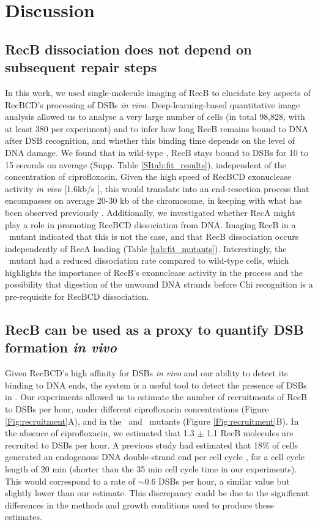 \section*{Discussion}

\subsection*{RecB dissociation does not depend on subsequent repair steps}
In this work, we used single-molecule imaging of RecB to elucidate key aspects of RecBCD's processing of DSBs \emph{in vivo}. Deep-learning-based quantitative image analysis allowed us to analyse a very large number of cells (in total 98,828, with at least 380 per experiment) and to infer how long RecB remains bound to DNA after DSB recognition, and whether this binding time depends on the level of DNA damage. We found that in wild-type \ecoli, RecB stays bound to DSBs for 10 to 15 seconds on average (Supp. Table \ref{SItab:fit_results}), independent of the concentration of ciprofloxacin. Given the high speed of RecBCD exonuclease activity \emph{in vivo} [1.6kb/s \cite{Wiktor2018}], this would translate into an end-resection process that encompasses on average 20-30 kb of the chromosome, in keeping with what has been observed previously \cite{Cockram2015, Wiktor2018}. Additionally, we investigated whether RecA might play a role in promoting RecBCD dissociation from DNA. Imaging RecB in a \dreca\ mutant indicated that this is not the case, and that RecB dissociation occurs independently of RecA loading (Table \ref{tab:fit_mutants}). Interestingly, the \geneteneighty\ mutant had a reduced dissociation rate compared to wild-type cells, which highlights the importance of RecB's exonuclease activity in the process and the possibility that digestion of the unwound DNA strands before Chi recognition is a pre-requisite for RecBCD dissociation.

\subsection*{RecB can be used as a proxy to quantify DSB formation \emph{in vivo}}
Given RecBCD's high affinity for DSBs \emph{in vivo} and our ability to detect its binding to DNA ends, the system is a useful tool to detect the presence of DSBs in \ecoli. Our experiments allowed us to estimate the number of recruitments of RecB to DSBs per hour, under different ciprofloxacin concentrations (Figure \ref{Fig:recruitment}A), and in the \dreca\ and \geneteneighty\ mutants (Figure \ref{Fig:recruitment}B). In the absence of ciprofloxacin, we estimated that 1.3 $\pm$ 1.1 RecB molecules are recruited to DSBs per hour. A previous study had estimated that 18\% of cells generated an endogenous DNA double-strand end per cell cycle \cite{Sinha2018}, for a cell cycle length of 20 min (shorter than the 35 min cell cycle time in our experiments). This would correspond to a rate of $\sim$0.6 DSBs per hour, a similar value but slightly lower than our estimate. This discrepancy could be due to the significant differences in the methods and growth conditions used to produce these estimates.

